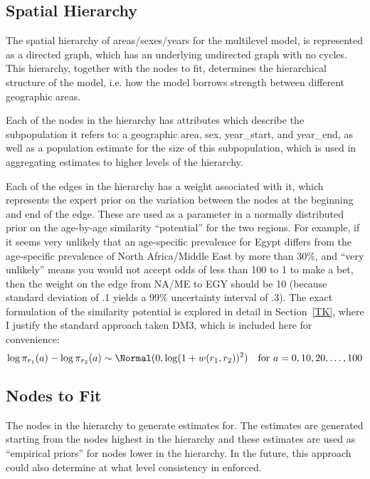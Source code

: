 \subsection{Spatial Hierarchy}
The spatial hierarchy of areas/sexes/years for the multilevel model, is represented as a
directed graph, which has an underlying undirected graph with no
cycles.  This hierarchy, together with the nodes to fit, determines the
hierarchical structure of the model, i.e. how the model borrows
strength between different geographic areas.

Each of the nodes in the hierarchy has attributes which describe the
subpopulation it refers to: a geographic area, sex, year_start, and
year_end, as well as a population estimate for the size of this
subpopulation, which is used in aggregating estimates to higher levels
of the hierarchy.

Each of the edges in the hierarchy has a weight associated with it,
which represents the expert prior on the variation between the nodes
at the beginning and end of the edge.  These are used as a parameter
in a normally distributed prior on the age-by-age similarity
``potential'' for the two regions.  For example, if it seems very
unlikely that an age-specific prevalence for Egypt differs from the
age-specific prevalence of North Africa/Middle East by more than 30\%,
and ``very unlikely'' means you would not accept odds of less than 100
to 1 to make a bet, then the weight on the edge from NA/ME to EGY should be
10 (because standard deviation of .1 yields a 99\% uncertainty
interval of .3).  The exact formulation of the similarity potential is
explored in detail in Section~\ref{TK}, where I justify the standard approach taken
DM3, which is included here for convenience:
\[
\log \pi_{r_1}(a) - \log \pi_{r_2}(a) \sim \Normal(0, \log(1 + w(r_1, r_2))^2)\quad \text{for } a = 0, 10, 20, \ldots, 100
\]

\subsection{Nodes to Fit}
The nodes in the hierarchy to generate estimates for.  The estimates
are generated starting from the nodes highest in the hierarchy and
these estimates are used as ``empirical priors'' for nodes lower in
the hierarchy.  In the future, this approach could also determine at
what level consistency in enforced.
